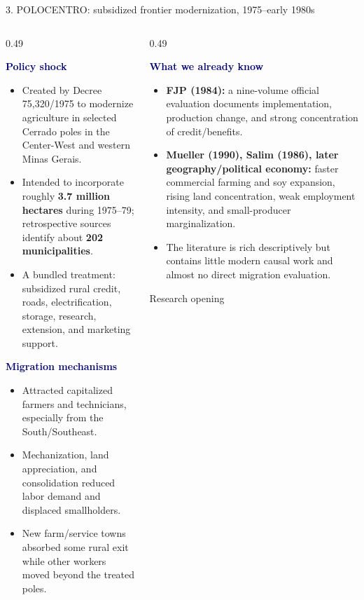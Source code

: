 \documentclass[aspectratio=169,10pt]{beamer}
\newcommand{\PolicyTag}[1]{%
  \colorbox{Sand}{\strut\textcolor{Navy}{\textbf{#1}}}}
\begin{document}
\begin{frame}{3. POLOCENTRO: subsidized frontier modernization, 1975--early 1980s}
\small
\begin{columns}[T,onlytextwidth]
\begin{column}{0.49\textwidth}
  \PolicyTag{Policy shock}
  \begin{itemize}\setlength\itemsep{0.28em}
    \item Created by Decree 75,320/1975 to modernize agriculture in selected Cerrado poles in the Center-West and western Minas Gerais.
    \item Intended to incorporate roughly \textbf{3.7 million hectares} during 1975--79; retrospective sources identify about \textbf{202 municipalities}.
    \item A bundled treatment: subsidized rural credit, roads, electrification, storage, research, extension, and marketing support.
  \end{itemize}
  \vspace{0.2em}
  \PolicyTag{Migration mechanisms}
  \begin{itemize}\setlength\itemsep{0.25em}
    \item Attracted capitalized farmers and technicians, especially from the South/Southeast.
    \item Mechanization, land appreciation, and consolidation reduced labor demand and displaced smallholders.
    \item New farm/service towns absorbed some rural exit while other workers moved beyond the treated poles.
  \end{itemize}
\end{column}
\begin{column}{0.49\textwidth}
  \PolicyTag{What we already know}
  \begin{itemize}\setlength\itemsep{0.28em}
    \item \textbf{FJP (1984):} a nine-volume official evaluation documents implementation, production change, and strong concentration of credit/benefits.
    \item \textbf{Mueller (1990), Salim (1986), later geography/political economy:} faster commercial farming and soy expansion, rising land concentration, weak employment intensity, and small-producer marginalization.
    \item The literature is rich descriptively but contains little modern causal work and almost no direct migration evaluation.
  \end{itemize}
  \begin{block}{Research opening}

\end{block}
\end{column}
\end{columns}
\end{frame}
\end{document}
